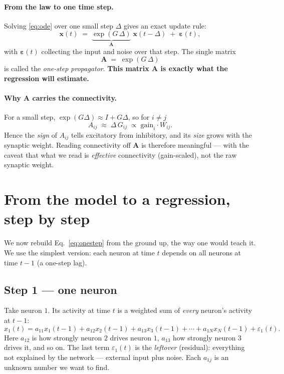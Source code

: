 \documentclass[11pt,a4paper]{article}
\newcommand{\xx}{\mathbf{x}}
\newcommand{\Amat}{\mathbf{A}}
\newcommand{\eps}{\boldsymbol{\varepsilon}}
\begin{document}
\paragraph{From the law to one time step.}
Solving \eqref{eq:ode} over one small step $\Delta$ gives an exact update rule:
\begin{equation}
\xx(t) \;=\; \underbrace{\exp(G\,\Delta)}_{\textstyle \Amat}\;\xx(t-\Delta)
\;+\; \eps(t),
\label{eq:onestep}
\end{equation}
with $\eps(t)$ collecting the input and noise over that step. The single matrix
\[
\boxed{\;\Amat \;=\; \exp(G\,\Delta)\;}
\]
is called the \emph{one-step propagator}. \textbf{This matrix $\Amat$ is exactly
what the regression will estimate.}

\paragraph{Why $\Amat$ carries the connectivity.}
For a small step, $\exp(G\Delta)\approx I + G\Delta$, so for $i\neq j$
\[
A_{ij}\;\approx\;\Delta\,G_{ij}\;\propto\;\text{gain}_i\cdot W_{ij}.
\]
Hence the \emph{sign} of $A_{ij}$ tells excitatory from inhibitory, and its
\emph{size} grows with the synaptic weight. Reading connectivity off $\Amat$ is
therefore meaningful --- with the caveat that what we read is
\emph{effective} connectivity (gain-scaled), not the raw synaptic weight.

\section{From the model to a regression, step by step}
\label{sec:steps}

We now rebuild Eq.~\eqref{eq:onestep} from the ground up, the way one would
teach it. We use the simplest version: each neuron at time $t$ depends on all
neurons at time $t-1$ (a one-step lag).

\subsection{Step 1 --- one neuron}
Take neuron $1$. Its activity at time $t$ is a weighted sum of \emph{every}
neuron's activity at $t-1$:
\begin{equation}
x_1(t) = a_{11}x_1(t{-}1) + a_{12}x_2(t{-}1) + a_{13}x_3(t{-}1)
         + \cdots + a_{1N}x_N(t{-}1) + \varepsilon_1(t).
\end{equation}
Here $a_{12}$ is how strongly neuron $2$ drives neuron $1$, $a_{13}$ how strongly
neuron $3$ drives it, and so on. The last term $\varepsilon_1(t)$ is the
\emph{leftover} (residual): everything not explained by the network --- external
input plus noise. Each $a_{1j}$ is an unknown number we want to find.
\end{document}
